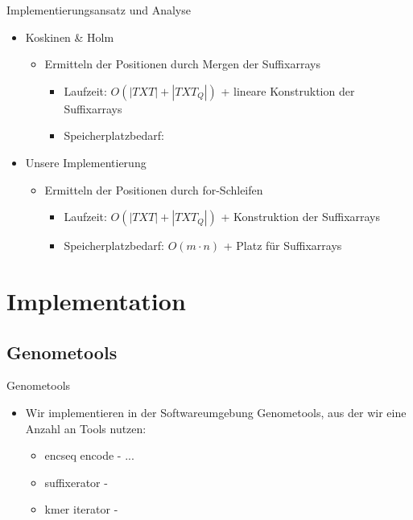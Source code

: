 \documentclass[aspectratio=1610]{beamer}
\begin{document}
\begin{frame}{Implementierungsansatz und Analyse}
  \begin{itemize}
    \item Koskinen \& Holm
      \begin{itemize}
        \item Ermitteln der Positionen durch Mergen der Suffixarrays
          \begin{itemize}
            \item Laufzeit: $O(|TXT|+|TXT_Q|)$ + lineare Konstruktion der Suffixarrays
            \item Speicherplatzbedarf:
          \end{itemize}
      \end{itemize}
    \item Unsere Implementierung
      \begin{itemize}
        \item Ermitteln der Positionen durch for-Schleifen
          \begin{itemize}
            \item Laufzeit: $O(|TXT|+|TXT_Q|)$ + Konstruktion der Suffixarrays
            \item Speicherplatzbedarf: $O(m \cdot n)$ + Platz für Suffixarrays
          \end{itemize}
      \end{itemize}
  \end{itemize}
\end{frame}

\section{Implementation}

\subsection{Genometools}

\begin{frame}{Genometools}
  \begin{itemize}
    \item Wir implementieren in der Softwareumgebung Genometools, aus der wir eine Anzahl an Tools nutzen:
    \begin{itemize}
      \item encseq encode - ...
      \item suffixerator -
      \item kmer iterator -
    \end{itemize}    
  \end{itemize}
\end{frame}
\end{document}
